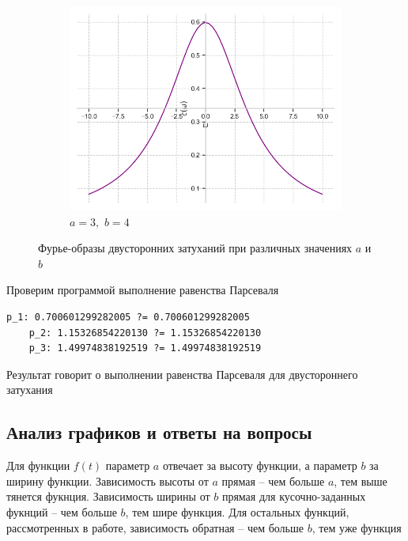 \documentclass[a4paper, 16pt]{article}
\begin{document}
\begin{figure}[htbp]
\begin{subfigure}{0.3\textwidth}
            \centering
            \includegraphics[width=\linewidth]{doatfimg_a=3_b=4.png}
            \caption{$a=3,\,\,b=4$}
            \label{fig:doatfimg_3}
        \end{subfigure}
        \caption{Фурье-образы двусторонних затуханий при различных значениях $a$ и $b$}
        \label{fig:doatfimgs}
    \end{figure}


    \noindent Проверим программой выполнение равенства Парсеваля
    \begin{lstlisting}[label=pars_doat, caption=Равенство Парсеваля для двустороннего затухания]
    p_1: 0.700601299282005 ?= 0.700601299282005
    p_2: 1.15326854220130 ?= 1.15326854220130
    p_3: 1.49974838192519 ?= 1.49974838192519
    \end{lstlisting}


    \noindent Результат говорит о выполнении равенства Парсеваля для двустороннего затухания


    \subsection{Анализ графиков и ответы на вопросы}
    \noindent Для функции $f(t)$ параметр $a$ отвечает за высоту функции, а параметр $b$ за
    ширину функции. Зависимость высоты от $a$ прямая -- чем больше $a$, тем выше тянется фукнция.
    Зависимость ширины от $b$ прямая для кусочно-заданных фукнций -- чем больше $b$, тем шире
    функция. Для остальных функций, рассмотренных в работе, зависимость обратная -- чем 
    больше $b$, тем уже функция
\end{document}
